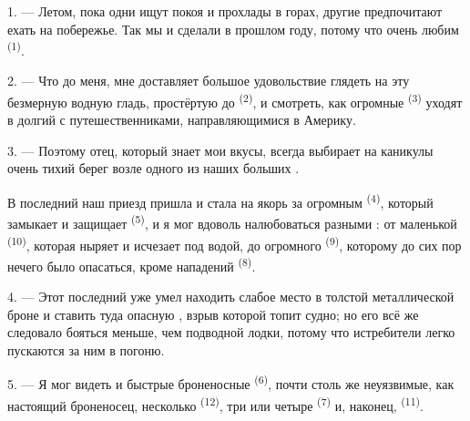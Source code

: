 %

\VUsaut{4.0mm}
\VUsaut{3.0mm}
\VUsaut{3.0mm}

1. --- Летом, пока одни ищут покоя и прохлады в горах, другие
предпочитают ехать на побережье. Так мы и сделали в прошлом году, потому
что очень любим  \textsuperscript{(1)}.

2. --- Что до меня, мне доставляет большое удовольствие глядеть на эту
безмерную водную гладь, простёртую до  \textsuperscript{(2)}, и
смотреть, как огромные  \textsuperscript{(3)} уходят в долгий
 с путешественниками, направляющимися в Америку.

3. --- Поэтому отец, который знает мои вкусы, всегда выбирает на каникулы
очень тихий берег возле одного из наших больших .

В последний наш приезд  пришла и стала на якорь за
огромным  \textsuperscript{(4)}, который замыкает и защищает
 \textsuperscript{(5)}, и я мог вдоволь налюбоваться
разными : от маленькой 
\textsuperscript{(10)}, которая ныряет и исчезает под водой, до огромного
 \textsuperscript{(9)}, которому до сих пор нечего было
опасаться, кроме нападений  \textsuperscript{(8)}.

\VUsaut{3.0mm}
\VUsaut{3.0mm}

4. --- Этот последний уже умел  находить слабое место в
толстой металлической броне и ставить туда опасную ,
взрыв которой топит судно; но его всё же следовало бояться меньше, чем
подводной лодки, потому что истребители легко пускаются за ним в погоню.

5. --- Я мог видеть и быстрые броненосные  \textsuperscript{(6)},
почти столь же неуязвимые, как настоящий броненосец, несколько
 \textsuperscript{(12)}, три или четыре 
\textsuperscript{(7)} и, наконец,  \textsuperscript{(11)}.

